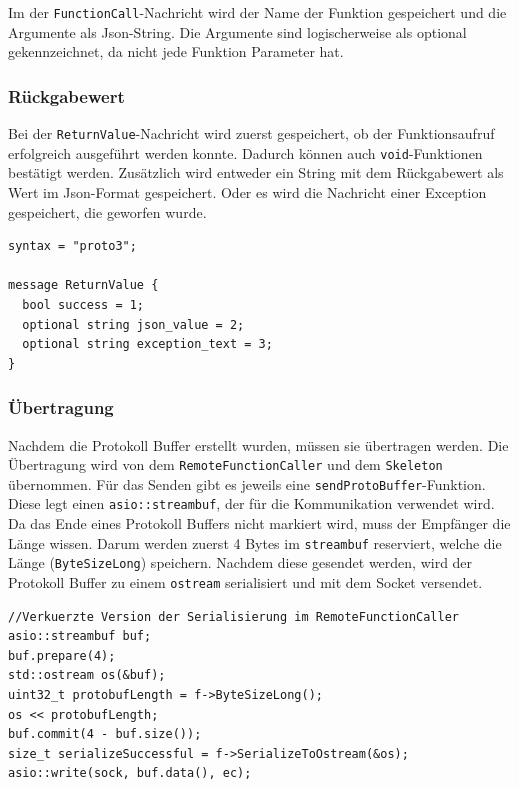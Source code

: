 \documentclass[a4paper,oneside,10pt]{report}
\begin{document}
Im der \texttt{FunctionCall}-Nachricht wird der Name der Funktion gespeichert und die Argumente als Json-String. Die Argumente sind logischerweise als optional gekennzeichnet, da nicht jede Funktion Parameter hat. 

\subsubsection{Rückgabewert}\label{proto:returnvalue}

Bei der \texttt{ReturnValue}-Nachricht wird zuerst gespeichert, ob der Funktionsaufruf erfolgreich ausgeführt werden konnte. Dadurch können auch \texttt{void}-Funktionen bestätigt werden. Zusätzlich wird entweder ein String mit dem Rückgabewert als Wert im Json-Format gespeichert. Oder es wird die Nachricht einer Exception gespeichert, die geworfen wurde. 

\begin{lstlisting}
syntax = "proto3";

message ReturnValue {
  bool success = 1;
  optional string json_value = 2;
  optional string exception_text = 3;
}
\end{lstlisting}

\subsubsection{Übertragung}

Nachdem die Protokoll Buffer erstellt wurden, müssen sie übertragen werden. Die Übertragung wird von dem \texttt{RemoteFunctionCaller} und dem \texttt{Skeleton} übernommen. Für das Senden gibt es jeweils eine \texttt{sendProtoBuffer}-Funktion. Diese legt einen \texttt{asio::streambuf}, der für die Kommunikation verwendet wird. Da das Ende eines Protokoll Buffers nicht markiert wird, muss der Empfänger die Länge wissen. Darum werden zuerst 4 Bytes im \texttt{streambuf} reserviert, welche die Länge (\texttt{ByteSizeLong}) speichern. Nachdem diese gesendet werden, wird der Protokoll Buffer zu einem \texttt{ostream} serialisiert und mit dem Socket versendet. 

\begin{lstlisting}
//Verkuerzte Version der Serialisierung im RemoteFunctionCaller
asio::streambuf buf;
buf.prepare(4);
std::ostream os(&buf);
uint32_t protobufLength = f->ByteSizeLong();
os << protobufLength;
buf.commit(4 - buf.size());
size_t serializeSuccessful = f->SerializeToOstream(&os);
asio::write(sock, buf.data(), ec);
\end{lstlisting}
\end{document}
